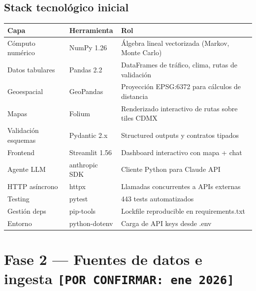 \documentclass[11pt,a4paper]{article}
\begin{document}
\subsection{Stack tecnológico inicial}
\begin{center}
\begin{tabularx}{\textwidth}{L{3.2cm} L{3.2cm} X}
\toprule
\textbf{Capa} & \textbf{Herramienta} & \textbf{Rol} \\
\midrule
Cómputo numérico      & NumPy 1.26      & Álgebra lineal vectorizada (Markov, Monte Carlo) \\
Datos tabulares       & Pandas 2.2      & DataFrames de tráfico, clima, rutas de validación \\
Geoespacial           & GeoPandas       & Proyección EPSG:6372 para cálculos de distancia \\
Mapas                 & Folium          & Renderizado interactivo de rutas sobre tiles CDMX \\
Validación esquemas   & Pydantic 2.x    & Structured outputs y contratos tipados \\
Frontend              & Streamlit 1.56  & Dashboard interactivo con mapa + chat \\
Agente LLM            & anthropic SDK   & Cliente Python para Claude API \\
HTTP asíncrono        & httpx           & Llamadas concurrentes a APIs externas \\
Testing               & pytest          & 443 tests automatizados \\
Gestión deps          & pip-tools       & Lockfile reproducible en requirements.txt \\
Entorno               & python-dotenv   & Carga de API keys desde .env \\
\bottomrule
\end{tabularx}
\end{center}

\section{Fase 2 --- Fuentes de datos e ingesta \texttt{[POR CONFIRMAR: ene 2026]}}
\end{document}
